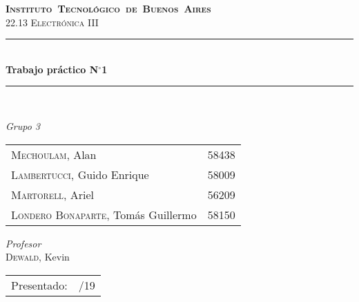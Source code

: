 \begin{titlepage}
\newcommand{\HRule}{\rule{\linewidth}{0.5mm}}
\center
\mbox{\textsc{\LARGE \bfseries {Instituto Tecnológico de Buenos Aires}}}\\[1.5cm]
\textsc{\Large 22.13 Electrónica III}\\[0.5cm]


\HRule \\[0.6cm]
{ \Huge \bfseries Trabajo práctico N$^{\circ}$1}\\[0.4cm] 
\HRule \\[1.5cm]


{\large

\emph{Grupo 3}\\
\vspace{3px}

\begin{tabular}{lr} 	
\textsc{Mechoulam}, Alan  &  58438\\
\textsc{Lambertucci}, Guido Enrique  & 58009 \\
\textsc{Martorell}, Ariel  & 56209 \\
\textsc{Londero Bonaparte}, Tomás Guillermo  & 58150 \\
\end{tabular}

\vspace{20px}

\emph{Profesor}\\
\vspace{3px}
\textsc{Dewald}, Kevin\\	

\vspace{100px}

\begin{tabular}{ll}

Presentado: & /19\\

\end{tabular}

}

\vfill

\end{titlepage}
